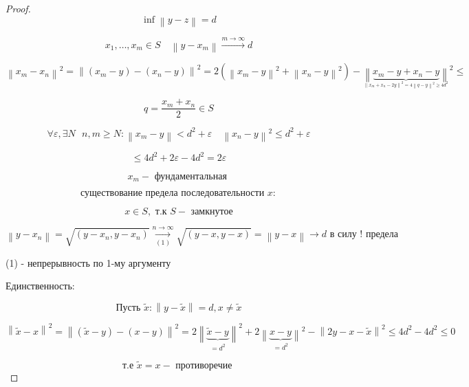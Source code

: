 \documentclass[12pt, a4paper]{report}
\begin{document}
\begin{proof}

    \[ \inf \left\lVert y -z  \right\rVert = d  \]  

    \[ x_1, \ldots, x_m \in  S \quad  \left\lVert  y - x_m       \right\rVert \xrightarrow{m \to  \infty } d   \] 

    \[ \left\lVert x_m - x_n         \right\rVert ^2 = \left\lVert (x_m - y ) - (x_n - y )  \right\rVert  ^2 = 2( \left\lVert  x_m - y   \right\rVert ^2 + \left\lVert  x_n - y      \right\rVert ^2 ) - \underset{_{\left\lVert x_m+ x_n - 2y  \right\rVert ^2 = 4 \left\lVert q - y  \right\rVert ^2 \geq 4 d ^2  }}{\left\lVert \underbrace{x_m - y + x_n - y }  \right\rVert }^2 \boxed{\le } \] 

    \[ q = \frac{x_m+ x_n }{2 } \in  S   \] 

    \[  \forall  \varepsilon , \exists  N \text{ }  n, m \geq  N :  \left\lVert x_m - y      \right\rVert  < d ^2 + \varepsilon \quad  \left\lVert  x_n - y  \right\rVert  ^2 \le  d ^2 + \varepsilon \] 

    \[ \boxed{\le  } 4 d ^2 + 2 \varepsilon - 4 d ^2 = 2 \varepsilon   \] 

    \[ x_m - \text{ фундаментальная }  \] 

    \[ \text{существование предела последовательности }   x: \] 

    \[  x \in  S , \text{ т.к }  S - \text{ замкнутое}  \] 

    \[ \left\lVert  y - x_n      \right\rVert = \sqrt{(y - x_n , y - x_n )} \underset{(1)}{\xrightarrow{n \to  \infty  } }\sqrt{(y - x, y -x )} = \left\lVert y -x  \right\rVert \to  d \text{ в силу ! предела}    \] 

    \begin{center}
        (1) - непрерывность по 1-му аргументу
    \end{center}

    Единственность: 

    \[ \text{Пусть } \tilde{x }: \left\lVert  y - \tilde{ x }\right\rVert = d , x \neq  \tilde{x } \] 

    \[ \left\lVert  \tilde{ x } - x      \right\rVert ^2 = \left\lVert  (\tilde{x }- y ) - ( x - y ) \right\rVert ^2 = 2\underset{= d ^2 }{\left\lVert \underbrace{\tilde{x }  - y}  \right\rVert}  ^2 +2\underset{= d ^2 }{\left\lVert \underbrace{x  - y}  \right\rVert} ^2 - \left\lVert 2 y - x - \tilde{x } \right\rVert ^2 \le 4 d ^2 - 4 d ^2 \le  0 \] 

    \[ \text{т.е } \tilde{x } = x - \text{ противоречие }  \] 

\end{proof}
\end{document}
